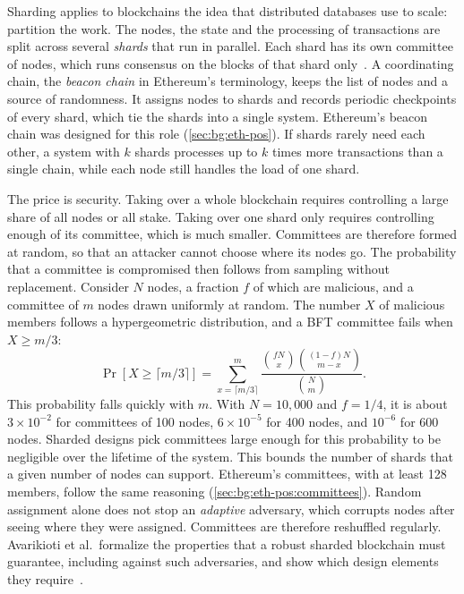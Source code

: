Sharding applies to blockchains the idea that distributed databases use to scale: partition the work.
The nodes, the state and the processing of transactions are split across several \emph{shards} that run in parallel.
Each shard has its own committee of nodes, which runs consensus on the blocks of that shard only~\cite{wang2019sok,al2024sok}.
A coordinating chain, the \emph{beacon chain} in Ethereum's terminology, keeps the list of nodes and a source of randomness.
It assigns nodes to shards and records periodic checkpoints of every shard, which tie the shards into a single system.
Ethereum's beacon chain was designed for this role (\autoref{sec:bg:eth-pos}).
If shards rarely need each other, a system with $k$ shards processes up to $k$ times more transactions than a single chain, while each node still handles the load of one shard.

The price is security.
Taking over a whole blockchain requires controlling a large share of all nodes or all stake.
Taking over one shard only requires controlling enough of its committee, which is much smaller.
Committees are therefore formed at random, so that an attacker cannot choose where its nodes go.
The probability that a committee is compromised then follows from sampling without replacement.
Consider $N$ nodes, a fraction $f$ of which are malicious, and a committee of $m$ nodes drawn uniformly at random.
The number $X$ of malicious members follows a hypergeometric distribution, and a BFT committee fails when $X \geq m/3$:
\[
	\Pr\left[X \geq \lceil m/3 \rceil\right] = \sum_{x=\lceil m/3 \rceil}^{m} \frac{\binom{fN}{x}\binom{(1-f)N}{m-x}}{\binom{N}{m}}.
\]
This probability falls quickly with $m$.
With $N = 10{,}000$ and $f = 1/4$, it is about $3\times10^{-2}$ for committees of 100 nodes, $6\times10^{-5}$ for 400 nodes, and $10^{-6}$ for 600 nodes. 
Sharded designs pick committees large enough for this probability to be negligible over the lifetime of the system.
This bounds the number of shards that a given number of nodes can support.
Ethereum's committees, with at least 128 members, follow the same reasoning (\autoref{sec:bg:eth-pos:committees}).
Random assignment alone does not stop an \emph{adaptive} adversary, which corrupts nodes after seeing where they were assigned.
Committees are therefore reshuffled regularly.
Avarikioti et al.\ formalize the properties that a robust sharded blockchain must guarantee, including against such adversaries, and show which design elements they require~\cite{avarikioti2023divide}.

